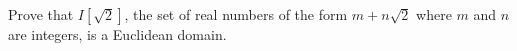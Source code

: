 Prove that $I[\sqrt{2}]$, the set of real numbers of the form $m + n\sqrt{2}$ where $m$ and $n$ are integers, is a Euclidean domain.